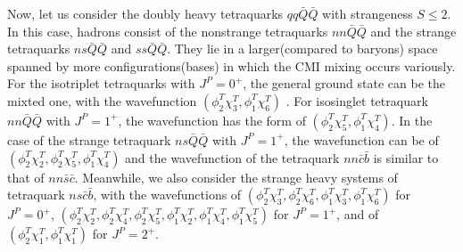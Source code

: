 \documentclass[prd,twocolumn,floatfix,nofootinbib]{revtex4}
\begin{document}
Now, let us consider the doubly heavy tetraquarks $qq\bar{Q}\bar{Q}$ with
strangeness $S\leq 2$. In this case, hadrons consist of the nonstrange
tetraquarks $nn\bar{Q}\bar{Q}$ and the strange tetraquarks $ns\bar{Q}\bar{Q}$
and $ss\bar{Q}\bar{Q}$. They lie in a larger(compared to baryons) space
spanned by more configurations(bases) in which the CMI mixing occurs
variously. For the isotriplet tetraquarks with $J^{P}=0^{+}$, the general
ground state can be the mixted one, with the wavefunction $(\phi
_{2}^{T}\chi _{3}^{T},\phi _{1}^{T}\chi _{6}^{T})$ . For isosinglet
tetraquark $nn\bar{Q}\bar{Q}$ with $J^{P}=1^{+}$, the wavefunction has the
form of $(\phi _{2}^{T}\chi _{5}^{T},\phi _{1}^{T}\chi _{4}^{T})$. In the
case of the strange tetraquark $ns\bar{Q}\bar{Q}$ with $J^{P}=1^{+}$, the
wavefunction can be of $(\phi _{2}^{T}\chi _{2}^{T},\phi _{2}^{T}\chi
_{5}^{T},\phi _{1}^{T}\chi _{4}^{T})$ and the wavefunction of the tetraquark
$nn$$\bar{c}\bar{b}$ is similar to that of $nn\bar{s}\bar{c}$. Meanwhile, we
also consider the strange heavy systems of tetraquark $ns\bar{c}\bar{b}$,
with the wavefunctions of $(\phi _{2}^{T}\chi _{3}^{T},\phi _{2}^{T}\chi
_{6}^{T},\phi _{1}^{T}\chi _{3}^{T},\phi _{1}^{T}\chi _{6}^{T})$ for $%
J^{P}=0^{+}$, $(\phi _{2}^{T}\chi _{2}^{T},\phi _{2}^{T}\chi _{4}^{T},\phi
_{2}^{T}\chi _{5}^{T},\phi _{1}^{T}\chi _{2}^{T},\phi _{1}^{T}\chi
_{4}^{T},\phi _{1}^{T}\chi _{5}^{T})$ for $J^{P}=1^{+}$, and of $(\phi
_{2}^{T}\chi _{1}^{T},\phi _{1}^{T}\chi _{1}^{T})$ for $J^{P}=2^{+}$.
\end{document}
